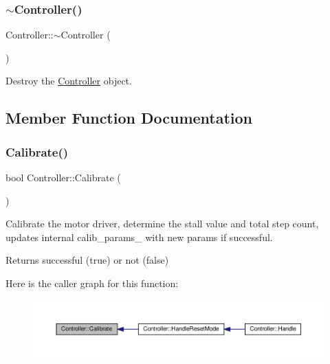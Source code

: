 \subsubsection{\texorpdfstring{$\sim$\+Controller()}{~Controller()}}
{\footnotesize\ttfamily Controller\+::$\sim$\+Controller (\begin{DoxyParamCaption}{ }\end{DoxyParamCaption})}



Destroy the \hyperlink{classController}{Controller} object. 



\subsection{Member Function Documentation}
\mbox{\label{classController_ad486f7baff22f9371933d84f327638a2}} 
\subsubsection{\texorpdfstring{Calibrate()}{Calibrate()}}
{\footnotesize\ttfamily bool Controller\+::\+Calibrate (\begin{DoxyParamCaption}{ }\end{DoxyParamCaption})\hspace{0.3cm}{\ttfamily [private]}}



Calibrate the motor driver, determine the stall value and total step count, updates internal calib\+\_\+params\+\_\+ with new params if successful. 

\begin{DoxyReturn}{Returns}
successful (true) or not (false) 
\end{DoxyReturn}
Here is the caller graph for this function\+:
\nopagebreak
\begin{figure}[H]
\begin{center}
\leavevmode
\includegraphics[width=350pt]{classController_ad486f7baff22f9371933d84f327638a2_icgraph}
\end{center}
\end{figure}
\mbox{\label{classController_a4705ffb61d722e4916ba0d279dc27395}} 
